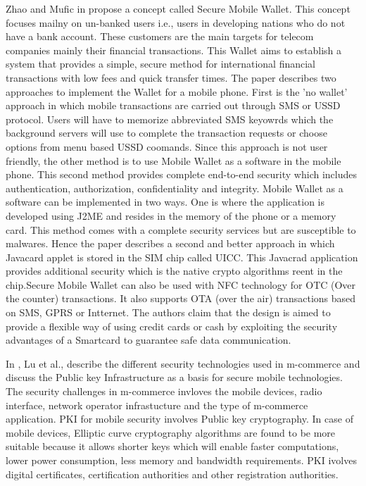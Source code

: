 \documentclass{mproj}
\begin{document}
Zhao and Mufic in \cite{zhao} propose a concept called Secure Mobile Wallet. This concept focuses mailny on un-banked users i.e., users in developing nations who do not have a bank account. These customers are the main targets for telecom companies mainly their financial transactions. This Wallet aims to establish a system that provides a simple, secure method for international financial transactions with low fees and quick transfer times. The paper describes two approaches to implement the Wallet for a mobile phone. First is the 'no wallet' approach in which mobile transactions are carried out through SMS or USSD protocol. Users will have to memorize abbreviated SMS keyowrds which the background servers will use to complete the transaction requests or choose options from menu based USSD coomands. Since this approach is not user friendly, the other method is to use Mobile Wallet as a software in the mobile phone. This second method provides complete end-to-end security which includes authentication, authorization, confidentiality and integrity. Mobile Wallet as a software can be implemented in two ways. One is where the application is developed using J2ME and resides in the memory of the phone or a memory card. This method comes with a complete security services but are susceptible to malwares. Hence the paper describes a second and better approach in which Javacard applet is stored in the SIM chip called UICC. This Javacrad application provides additional security which is the native crypto algorithms reent in the chip.Secure Mobile Wallet can also be used with NFC technology for OTC (Over the counter) transactions. It also supports OTA (over the air) transactions based on SMS, GPRS or Intternet. The authors claim that the design is aimed to provide a flexible way of using credit cards or cash by exploiting the security advantages of a Smartcard to guarantee safe data communication.

In \cite{nambiar2004}, Lu et al., describe the different security technologies used in m-commerce and discuss the Public key Infrastructure as a basis for secure mobile technologies. The security challenges in m-commerce invloves the mobile devices, radio interface, network operator infrastucture and the type of m-commerce application. PKI for mobile security involves Public key cryptography. In case of mobile devices, Elliptic curve cryptography algorithms are found to be more suitable because it allows shorter keys which will enable faster computations, lower power consumption, less memory and bandwidth requirements. PKI ivolves digital certificates, certification authorities and other registration authorities.
\end{document}
